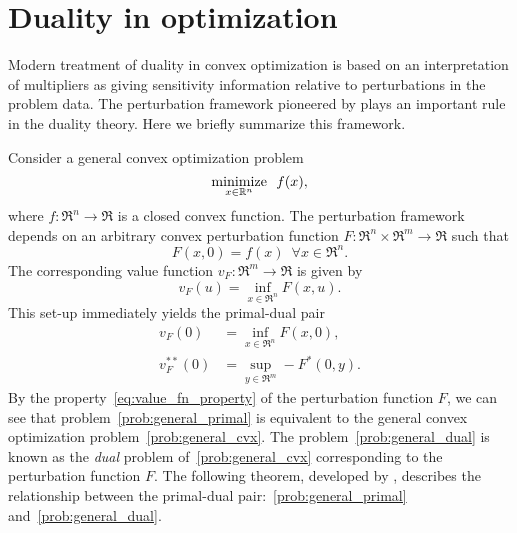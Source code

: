 \section{Duality in optimization}

Modern treatment of duality in convex optimization is based on an interpretation of multipliers as giving sensitivity information relative to perturbations in the problem data. The perturbation framework pioneered by \citet{rockafellar1970convex} plays an important rule in the duality theory. Here we briefly summarize this framework. 

Consider a general convex optimization problem
\begin{equation} \label{prob:general_cvx}
    \displaystyle\mathop{\hbox{\rm minimize}}_{x \in \mathbb{R}^n}\enspace f(x),
\end{equation}
where $f:\Re^n \to \Re$ is a closed convex function. The perturbation framework depends on an arbitrary convex perturbation function $F: \Re^n \times \Re^m \to \Re$ such that 
\begin{equation} \label{eq:value_fn_property}
    F(x, 0) = f(x) \enspace \forall x \in \Re^n.
\end{equation}
The corresponding value function $v_F : \Re^m \to \Re$ is given by 
\begin{equation}
    v_F(u) = \inf_{x \in \Re^n} F(x, u).
\end{equation}
This set-up immediately yields the primal-dual pair
\begin{align}
    v_F(0) &= \inf_{x \in \Re^n} F(x, 0), \label{prob:general_primal}\\
    v_F^{**}(0) &= \sup_{y \in \Re^m} -F^*(0, y). \label{prob:general_dual}
\end{align}
By the property~\eqref{eq:value_fn_property} of the perturbation function $F$, we can see that problem~\eqref{prob:general_primal} is equivalent to the general convex optimization problem~\eqref{prob:general_cvx}. The problem~\eqref{prob:general_dual} is known as the \emph{dual} problem of~\eqref{prob:general_cvx} corresponding to the perturbation function $F$. 
The following theorem, developed by \citet{rockafellar1998variational}, describes the relationship between the primal-dual pair:~\eqref{prob:general_primal} and~\eqref{prob:general_dual}. 

